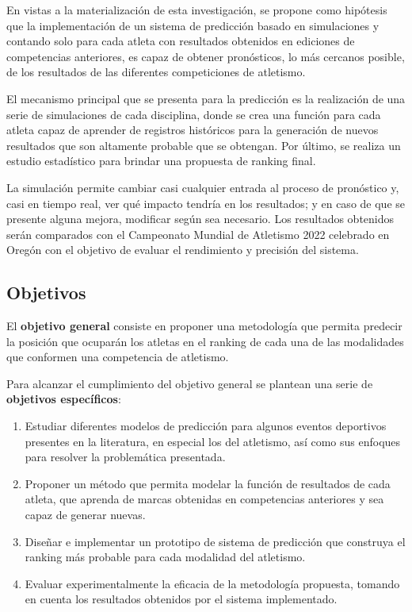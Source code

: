 En vistas a la materialización de esta investigación, se propone como hipótesis que la implementación de un sistema de predicción basado en simulaciones y contando solo para cada atleta con resultados obtenidos en ediciones de competencias anteriores, es capaz de obtener pronósticos, lo más cercanos posible, de los resultados de las diferentes competiciones de atletismo.

El mecanismo principal que se presenta para la predicción es la realización de una serie de simulaciones de cada disciplina, donde se crea una función para cada atleta capaz de aprender de registros históricos para la generación de nuevos resultados que son altamente probable que se obtengan. Por último, se realiza un estudio estadístico para brindar una propuesta de ranking final.

La simulación permite cambiar casi cualquier entrada al proceso de pronóstico y, casi en tiempo real, ver qué impacto tendría en los resultados; y en caso de que se presente alguna mejora, modificar según sea necesario. Los resultados obtenidos serán comparados con el Campeonato Mundial de Atletismo 2022 celebrado en Oregón con el objetivo de evaluar el rendimiento y precisión del sistema.

\subsection*{Objetivos}

El \textbf{objetivo general} consiste en proponer una metodología que permita predecir la posición que ocuparán los atletas en el ranking de cada una de las modalidades que conformen una competencia de atletismo.

Para alcanzar el cumplimiento del objetivo general se plantean una serie de \textbf{objetivos específicos}:

\begin{enumerate}
\item Estudiar diferentes modelos de predicción para algunos eventos deportivos presentes en la literatura, en especial los del atletismo, así como sus enfoques para resolver la problemática presentada.
\item Proponer un método que permita modelar la función de resultados de cada atleta, que aprenda de marcas obtenidas en competencias anteriores y sea capaz de generar nuevas.
\item Diseñar e implementar un prototipo de sistema de predicción que construya el ranking más probable para cada modalidad del atletismo.
\item Evaluar experimentalmente la eficacia de la metodología propuesta, tomando en cuenta los resultados obtenidos por el sistema implementado.
\end{enumerate}


